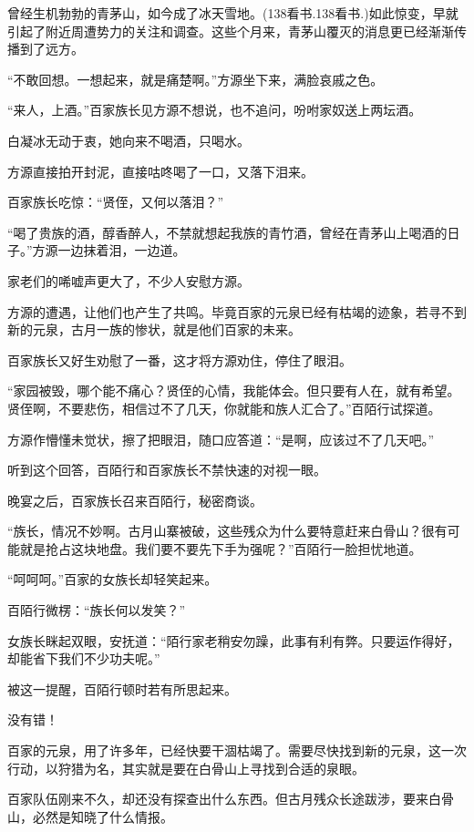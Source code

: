 
\begin{this_body}

曾经生机勃勃的青茅山，如今成了冰天雪地。(138看书.138看书.)如此惊变，早就引起了附近周遭势力的关注和调查。这些个月来，青茅山覆灭的消息更已经渐渐传播到了远方。

“不敢回想。一想起来，就是痛楚啊。”方源坐下来，满脸哀戚之色。

“来人，上酒。”百家族长见方源不想说，也不追问，吩咐家奴送上两坛酒。

白凝冰无动于衷，她向来不喝酒，只喝水。

方源直接拍开封泥，直接咕咚喝了一口，又落下泪来。

百家族长吃惊：“贤侄，又何以落泪？”

“喝了贵族的酒，醇香醉人，不禁就想起我族的青竹酒，曾经在青茅山上喝酒的日子。”方源一边抹着泪，一边道。

家老们的唏嘘声更大了，不少人安慰方源。

方源的遭遇，让他们也产生了共鸣。毕竟百家的元泉已经有枯竭的迹象，若寻不到新的元泉，古月一族的惨状，就是他们百家的未来。

百家族长又好生劝慰了一番，这才将方源劝住，停住了眼泪。

“家园被毁，哪个能不痛心？贤侄的心情，我能体会。但只要有人在，就有希望。贤侄啊，不要悲伤，相信过不了几天，你就能和族人汇合了。”百陌行试探道。

方源作懵懂未觉状，擦了把眼泪，随口应答道：“是啊，应该过不了几天吧。”

听到这个回答，百陌行和百家族长不禁快速的对视一眼。

晚宴之后，百家族长召来百陌行，秘密商谈。

“族长，情况不妙啊。古月山寨被破，这些残众为什么要特意赶来白骨山？很有可能就是抢占这块地盘。我们要不要先下手为强呢？”百陌行一脸担忧地道。

“呵呵呵。”百家的女族长却轻笑起来。

百陌行微楞：“族长何以发笑？”

女族长眯起双眼，安抚道：“陌行家老稍安勿躁，此事有利有弊。只要运作得好，却能省下我们不少功夫呢。”

被这一提醒，百陌行顿时若有所思起来。

没有错！

百家的元泉，用了许多年，已经快要干涸枯竭了。需要尽快找到新的元泉，这一次行动，以狩猎为名，其实就是要在白骨山上寻找到合适的泉眼。

百家队伍刚来不久，却还没有探查出什么东西。但古月残众长途跋涉，要来白骨山，必然是知晓了什么情报。


\end{this_body}
